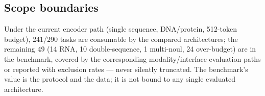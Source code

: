 \subsection{Scope boundaries}
\label{sec:boundaries}

Under the current encoder path (single sequence, DNA/protein, 512-token budget), 241/290
tasks are consumable by the compared architectures; the remaining 49 (14 RNA, 10
double-sequence, 1 multi-noul, 24 over-budget) are in the benchmark, covered by the
corresponding modality/interface evaluation paths or reported with exclusion rates ---
never silently truncated. The benchmark's value is the protocol and the data; it is not
bound to any single evaluated architecture.
